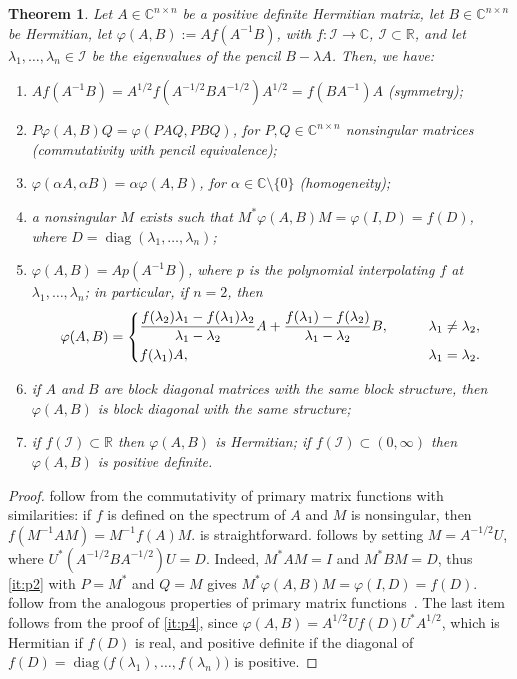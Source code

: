 \documentclass[DIV=14]{scrartcl}
\newcommand{\C}{\ensuremath{\mathbb C}}
\newcommand{\Cnn}{\ensuremath{\C^{n \times n}}}
\theoremstyle{thmstyletwo}
\newtheorem{theorem}{Theorem}
\theoremstyle{definition}
\numberwithin{equation}{section}
\DeclareMathOperator{\diag}{diag}
\newcommand{\deq}{\ensuremath{:=}}
\begin{document}
\begin{theorem}\label{thm:4}
Let $A \in \Cnn$ be a positive definite Hermitian matrix, let $B \in \Cnn$ be Hermitian, let $\varphi(A,B) \deq{} Af(A^{-1}B)$, with $f:\mathcal I\rightarrow \C$, $\mathcal I\subset \mathbb R$, and let $\lambda_1,\ldots,\lambda_n\in\mathcal I$ be the eigenvalues of the pencil $B-\lambda A$.
Then, we have:
\begin{enumerate}[label=(\alph*), ref=(\alph*)]
\item $Af(A^{-1}B) = A^{1/2}f(A^{-1/2}BA^{-1/2})A^{1/2} = f(BA^{-1})A$ (symmetry);\label{it:p1}
\item $P\varphi(A,B)Q=\varphi(PAQ,PBQ)$, for $P,Q\in\C^{n\times n}$ nonsingular matrices (commutativity with pencil equivalence); \label{it:p2}
\item $\varphi(\alpha A,\alpha B)=\alpha\varphi(A,B)$, for $\alpha\in\mathbb C\setminus\{0\}$ (homogeneity);\label{it:p3}
\item a nonsingular $M$ exists such that $M^*\varphi(A,B)M=\varphi(I,D)=f(D)$, where $D=\diag(\lambda_1,\ldots,\lambda_n)$;\label{it:p4}
\item $\varphi(A,B)=Ap(A^{-1}B)$, where $p$ is the polynomial interpolating $f$ at $\lambda_1,\ldots,\lambda_n$; in particular, if $n=2$, then
\begin{equation}\label{eq:15}
\varphi(A,B) = \begin{dcases}
\frac{f(\lambda_2)\lambda_1-f(\lambda_1)\lambda_2}{\lambda_1-\lambda_2}A
+\frac{f(\lambda_1)-f(\lambda_2)}{\lambda_1-\lambda_2} B,\qquad&\lambda_1 \neq \lambda_2,\\
f(\lambda_1)A,&\lambda_1 = \lambda_2.
\end{dcases}
\end{equation}
\label{it:p5}

\item if $A$ and $B$ are block diagonal matrices with the same block structure, then $\varphi(A,B)$ is block diagonal with the same structure;\label{it:p6}
\item if $f(\mathcal I)\subset \mathbb R$ then $\varphi(A,B)$ is Hermitian; if $f(\mathcal I)\subset (0,\infty)$ then $\varphi(A,B)$ is positive definite.
\end{enumerate}
\end{theorem}
\begin{proof}
 follow from the commutativity of primary matrix functions with similarities: if $f$ is defined on the spectrum of $A$ and $M$ is nonsingular, then $f(M^{-1}AM)=M^{-1}f(A)M$.  is straightforward.  follows by setting $M=A^{-1/2}U$, where $U^*(A^{-1/2}BA^{-1/2})U=D$. Indeed, $M^*AM=I$ and $M^*BM=D$, thus \cref{it:p2} with $P=M^*$ and $Q=M$ gives {$M^*\varphi(A,B)M=\varphi(I,D)=f(D)$.}
 follow from the analogous properties of primary matrix functions~\cite[Chap.~1]{higham:book08}.
The last item follows from the proof of \cref{it:p4}, since $\varphi(A,B)=A^{1/2}Uf(D)U^*A^{1/2}$, which is Hermitian if $f(D)$ is real, and positive definite if the diagonal of $f(D) = \diag\bigl(f(\lambda_1),\ldots,f(\lambda_n)\bigr)$ is positive.
\end{proof}
\end{document}
